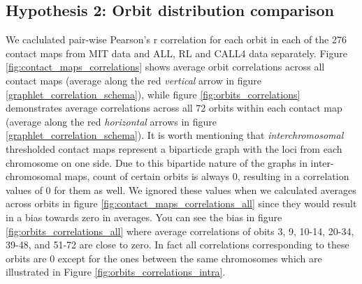 \documentclass[a4,center,fleqn]{NAR}
\begin{document}
\subsection{Hypothesis 2: Orbit distribution comparison}
We caclulated pair-wise Pearson's r correlation for each orbit in each of the 276
contact maps from MIT data and ALL, RL and CALL4 data separately. 
Figure \ref{fig:contact_maps_correlations}
shows average orbit correlations across all contact maps
(average along the red \textit{vertical} arrow in figure 
\ref{graphlet_correlation_schema}), while
figure \ref{fig:orbits_correlations} 
demonstrates average correlations across all 72 orbits within each  contact map
(average along the red \textit{horizontal} arrows in figure 
\ref{graphlet_correlation_schema}).
It is worth mentioning that \textit{interchromosomal} thresholded contact maps 
represent
a biparticde graph with the loci from each chromosome on one side. Due to this
bipartide nature of the graphs in inter-chromosomal maps,
count of certain orbits is always 0, resulting in
a correlation values of 0 for them as well.
We ignored these values  when we calculated averages across orbits 
in figure \ref{fig:contact_maps_correlations_all} since they
would result in a bias towards zero in averages. You can see the bias in 
figure \ref{fig:orbits_correlations_all} where average correlations of obits
3, 9, 10-14, 20-34, 39-48, and 51-72 are close to zero. In fact all correlations
corresponding to these orbits are 0 except for the ones between the same 
chromosomes which are illustrated in Figure 
\ref{fig:orbits_correlations_intra}.
\end{document}
